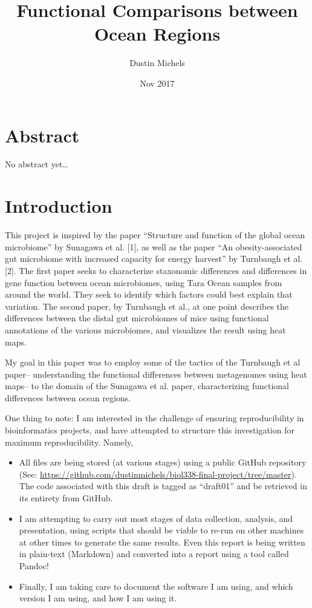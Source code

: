 \documentclass[12pt,a4paper,]{article}
\title{Functional Comparisons between Ocean Regions}
\author{Dustin Michels}
\date{Nov 2017}
\providecommand{\tightlist}{%
  \setlength{\itemsep}{0pt}\setlength{\parskip}{0pt}}
\begin{document}
\maketitle

\section{Abstract}\label{abstract}

No abstract yet\ldots{}

\section{Introduction}\label{introduction}

This project is inspired by the paper ``Structure and function of the
global ocean microbiome'' by Sunagawa et al. {[}1{]}, as well as the
paper ``An obesity-associated gut microbiome with increased capacity for
energy harvest'' by Turnbaugh et al. {[}2{]}. The first paper seeks to
characterize staxonomic differences and differences in gene function
between ocean microbiomes, using Tara Ocean samples from around the
world. They seek to identify which factors could best explain that
variation. The second paper, by Turnbaugh et al., at one point describes
the differences between the distal gut microbiomes of mice using
functional annotations of the various microbiomes, and visualizes the
result using heat maps.

My goal in this paper was to employ some of the tactics of the Turnbaugh
et al paper-- understanding the functional differences between
metagenomes using heat maps-- to the domain of the Sunagawa et al.
paper, characterizing functional differences between ocean regions.

One thing to note: I am interested in the challenge of ensuring
reproducibility in bioinformatics projects, and have attempted to
structure this investigation for maximum reproducibility. Namely,

\begin{itemize}
\tightlist
\item
  All files are being stored (at various stages) using a public GitHub
  repository (See:
  \url{https://github.com/dustinmichels/biol338-final-project/tree/master}).
  The code associated with this draft is tagged as ``draft01'' and be
  retrieved in its entirety from GitHub.
\item
  I am attempting to carry out most stages of data collection, analysis,
  and presentation, using scripts that should be viable to re-run on
  other machines at other times to generate the same results. Even this
  report is being written in plain-text (Markdown) and converted into a
  report using a tool called Pandoc!
\item
  Finally, I am taking care to document the software I am using, and
  which version I am using, and how I am using it.
\end{itemize}
\end{document}
